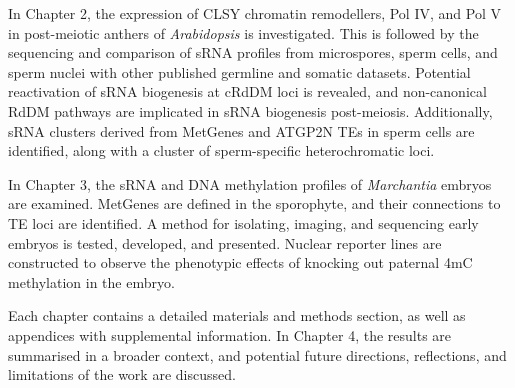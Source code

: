 In Chapter 2, the expression of CLSY chromatin remodellers, Pol IV, and Pol V in post-meiotic anthers of \textit{Arabidopsis} is investigated. This is followed by the sequencing and comparison of sRNA profiles from microspores, sperm cells, and sperm nuclei with other published germline and somatic datasets. Potential reactivation of sRNA biogenesis at cRdDM loci is revealed, and non-canonical RdDM pathways are implicated in sRNA biogenesis post-meiosis. Additionally, sRNA clusters derived from MetGenes and ATGP2N TEs in sperm cells are identified, along with a cluster of sperm-specific heterochromatic loci.

In Chapter 3, the sRNA and DNA methylation profiles of \textit{Marchantia} embryos are examined. MetGenes are defined in the sporophyte, and their connections to TE loci are identified. A method for isolating, imaging, and sequencing early embryos is tested, developed, and presented. Nuclear reporter lines are constructed to observe the phenotypic effects of knocking out paternal 4mC methylation in the embryo.

Each chapter contains a detailed materials and methods section, as well as appendices with supplemental information. In Chapter 4, the results are summarised in a broader context, and potential future directions, reflections, and limitations of the work are discussed.

